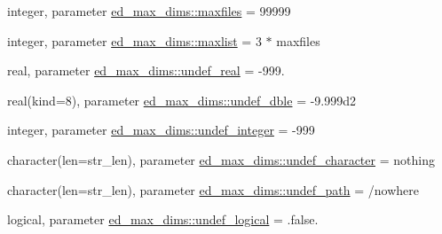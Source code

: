 \begin{DoxyCompactItemize}
\item 
integer, parameter \hyperlink{namespaceed__max__dims_a45e43025f8cc741156429739b0501e1e}{ed\+\_\+max\+\_\+dims\+::maxfiles} = 99999
\item 
integer, parameter \hyperlink{namespaceed__max__dims_a044088d546c2e93b93de0b814f696be7}{ed\+\_\+max\+\_\+dims\+::maxlist} = 3 $\ast$ maxfiles
\item 
real, parameter \hyperlink{namespaceed__max__dims_aef3aefdf7aea5b758051bfc525dc719d}{ed\+\_\+max\+\_\+dims\+::undef\+\_\+real} = -\/999.
\item 
real(kind=8), parameter \hyperlink{namespaceed__max__dims_afb7d078e8eb6e8094ff979414b2500cf}{ed\+\_\+max\+\_\+dims\+::undef\+\_\+dble} = -\/9.\+999d2
\item 
integer, parameter \hyperlink{namespaceed__max__dims_a5cb1206cd6171b2aac2b47b056fcde4b}{ed\+\_\+max\+\_\+dims\+::undef\+\_\+integer} = -\/999
\item 
character(len=str\+\_\+len), parameter \hyperlink{namespaceed__max__dims_ae43730f1b622bf8a25fe78b4e8a8dd8f}{ed\+\_\+max\+\_\+dims\+::undef\+\_\+character} = \textquotesingle{}nothing\textquotesingle{}
\item 
character(len=str\+\_\+len), parameter \hyperlink{namespaceed__max__dims_ab42483146ea3e3c0eba8d1de6e746691}{ed\+\_\+max\+\_\+dims\+::undef\+\_\+path} = \textquotesingle{}/nowhere\textquotesingle{}
\item 
logical, parameter \hyperlink{namespaceed__max__dims_afc1309671c882a76723979195b5fc607}{ed\+\_\+max\+\_\+dims\+::undef\+\_\+logical} = .false.
\end{DoxyCompactItemize}
